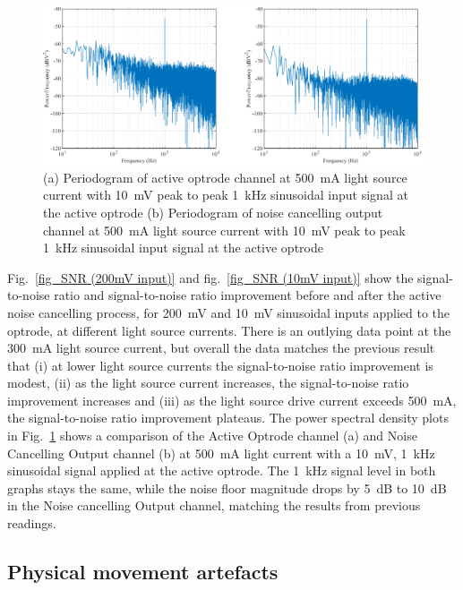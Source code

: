 \begin{figure}[htbp]
\centerline{\includegraphics[scale=1]{5-Experiment/Periodogram 500mA (10mV input).pdf}}
\caption{(a) Periodogram of active optrode channel at \qty{500}{\mA} light source current with \qty{10}{\mV} peak to peak \qty{1}{\kHz} sinusoidal input signal at the active optrode (b) Periodogram of noise cancelling output channel at \qty{500}{\mA} light source current with \qty{10}{\mV} peak to peak \qty{1}{\kHz} sinusoidal input signal at the active optrode}
\label{fig_Periodogram 500mA (10mV input)}
\end{figure}

Fig.~\ref{fig_SNR (200mV input)} and fig.~\ref{fig_SNR (10mV input)} show the signal-to-noise ratio and signal-to-noise ratio improvement before and after the active noise cancelling process, for \qty{200}{mV} and \qty{10}{mV} sinusoidal inputs applied to the optrode, at different light source currents.  There is an outlying data point at the \qty{300}{mA} light source current, but overall the data matches the previous result that (i) at lower light source currents the signal-to-noise ratio improvement is modest, (ii) as the light source current increases, the signal-to-noise ratio improvement increases and (iii) as the light source drive current exceeds \qty{500}{mA}, the signal-to-noise ratio improvement plateaus. The power spectral density plots in Fig.~\ref{fig_Periodogram 500mA (10mV input)} shows a comparison of the Active Optrode channel (a) and Noise Cancelling Output channel (b) at \qty{500}{mA} light current with a \qty{10}{\mV}, \qty{1}{\kHz} sinusoidal signal applied at the active optrode.  The \qty{1}{\kHz} signal level in both graphs stays the same, while the noise floor magnitude drops by \qty{5}{dB} to \qty{10}{dB} in the Noise cancelling Output channel, matching the results from previous readings.

\subsection{Physical movement artefacts}

